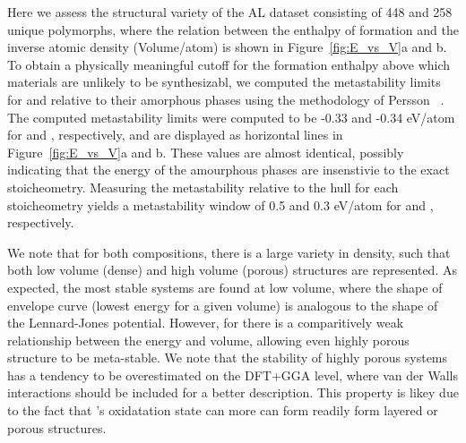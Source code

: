 
Here we assess the structural variety of the AL dataset consisting of 448 \IrOtwo and 258 \IrOthree unique polymorphs,
where the relation between the enthalpy of formation and the inverse atomic density (Volume/atom) is shown in Figure~\ref{fig:E_vs_V}a and b.
%
To obtain a physically meaningful cutoff for the formation enthalpy above which materials are unlikely to be synthesizabl, we computed the metastability limits for \IrOtwo and \IrOthree relative to their amorphous phases using the methodology of Persson ~\cite{Aykol2018}.
%
The computed metastability limits were computed to be -0.33 and -0.34 eV/atom for \IrOtwo and \IrOthree, respectively,
and are displayed as horizontal lines in Figure~\ref{fig:E_vs_V}a and b.
%
These values are almost identical, possibly indicating that the energy of the amourphous phases are insenstivie to the exact stoicheometry.
%
Measuring the metastability relative to the hull for each stoicheometry yields a metastability window of 0.5 and 0.3 eV/atom for \IrOtwo and \IrOthree, respectively.


We note that for both compositions,
there is a large variety in density,
such that both low volume (dense) and high volume (porous) structures are represented.
%
As expected, the most stable systems are found at low volume,
where the shape of envelope curve (lowest energy for a given volume) is analogous to the shape of the Lennard-Jones potential.
%
However, for \IrOthree there is a comparitively weak relationship between the energy and volume,
allowing even highly porous structure to be meta-stable.
%
We note that the stability of highly porous systems has a tendency to be overestimated on the DFT+GGA level, where van der Walls interactions should be included for a better description.
%
This property is likey due to the fact that \IrOthree's oxidatation state can more can form readily form layered or porous structures.


